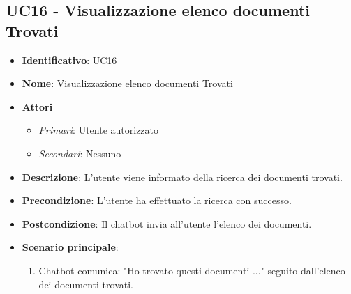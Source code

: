 \subsection{UC16 - Visualizzazione elenco documenti Trovati}
\begin{itemize}
	\item \textbf{Identificativo}: UC16
	\item \textbf{Nome}: Visualizzazione elenco documenti Trovati
	\item \textbf{Attori}
	\begin{itemize} 
		\item \textit{Primari}: Utente autorizzato
		\item \textit{Secondari}: Nessuno
	\end{itemize}
	\item \textbf{Descrizione}: L'utente viene informato della ricerca dei documenti trovati.
	\item \textbf{Precondizione}: L'utente ha effettuato la ricerca con successo.
	\item \textbf{Postcondizione}: Il chatbot invia all'utente l'elenco dei documenti.
	\item \textbf{Scenario principale}: \begin{enumerate}
		\item Chatbot comunica: "Ho trovato questi documenti ..." seguito dall'elenco dei documenti trovati.
	\end{enumerate}
\end{itemize}
